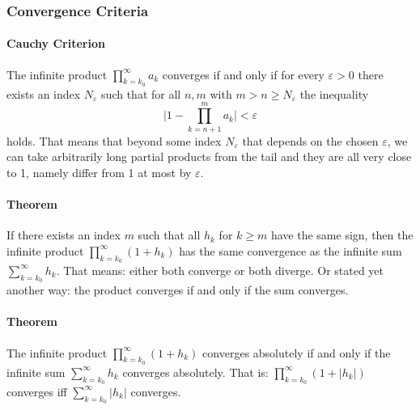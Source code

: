 \subsubsection{Convergence Criteria}


\paragraph{Cauchy Criterion} The infinite product $\prod_{k=k_0}^{\infty} a_k$ converges if and only if for every $\varepsilon > 0$ there exists an index $N_{\varepsilon}$ such that for all $n,m$ with $m > n \geq N_{\varepsilon}$ the inequality 
\begin{equation}
 \Bigg| 1 -\prod_{k=n+1}^{m} a_k \Bigg| < \varepsilon
\end{equation}
holds. That means that beyond some index $N_{\varepsilon}$ that depends on the chosen $\varepsilon$, we can take arbitrarily long partial products from the tail and they are all very close to 1, namely differ from 1 at most by $\varepsilon$.


\paragraph{Theorem} If there exists an index $m$ such that all $h_k$ for $k \geq m$ have the same sign, then the infinite product $\prod_{k=k_0}^{\infty} (1 + h_k)$ has the same convergence as the infinite sum $\sum_{k=k_0}^{\infty} h_k$. That means: either both converge or both diverge. Or stated yet another way: the product converges if and only if the sum converges. 

\paragraph{Theorem} The infinite product $\prod_{k=k_0}^{\infty} (1 + h_k)$ converges absolutely if and only if  the infinite sum $\sum_{k=k_0}^{\infty} h_k$ converges absolutely. That is:  $\prod_{k=k_0}^{\infty} (1 + |h_k|)$ converges iff  $\sum_{k=k_0}^{\infty} |h_k|$ converges.

